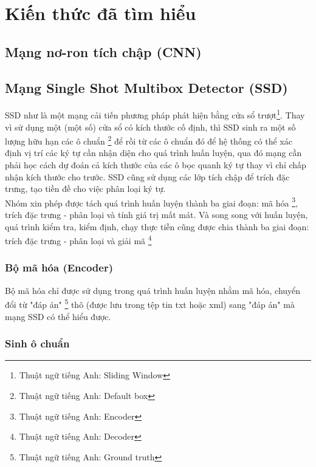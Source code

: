 \documentclass[a4paper,12pt]{article}
\begin{document}
	
	
	
	\newpage
	\section{Kiến thức đã tìm hiểu}
	\subsection{Mạng nơ-ron tích chập (CNN)}
	
	\subsection{Mạng Single Shot Multibox Detector (SSD)}
	
	SSD như là một mạng cải tiến phương pháp phát hiện bằng cửa sổ trượt\footnote{Thuật ngữ tiếng Anh: Sliding Window}. Thay vì sử dụng một (một số) cửa sổ có kích thước cố định, thì SSD sinh ra một số lượng hữu hạn các ô chuẩn \footnote{Thuật ngữ tiếng Anh: Default box} để rồi từ các ô chuẩn đó để hệ thống có thể xác định vị trí các ký tự cần nhận diện cho quá trình huấn luyện, qua đó mạng cần phải học cách dự đoán cả kích thước của các ô bọc quanh ký tự thay vì chỉ chấp nhận kích thước cho trước. SSD cũng sử dụng các lớp tích chập để trích đặc trưng, tạo tiền đề cho việc phân loại ký tự. \\
	
	Nhóm xin phép được tách quá trình huấn luyện thành ba giai đoạn: mã hóa \footnote{Thuật ngữ tiếng Anh: Encoder}, trích đặc trưng - phân loại và tính giá trị mất mát. Và song song với huấn luyện, quá trình kiểm tra, kiểm định, chạy thực tiễn cũng được chia thành ba giai đoạn: trích đặc trưng - phân loại và giải mã \footnote{Thuật ngữ tiếng Anh: Decoder}
	
	\subsubsection{Bộ mã hóa (Encoder)}
	Bộ mã hóa chỉ được sử dụng trong quá trình huấn luyện nhằm mã hóa, chuyển đổi từ "đáp án" \footnote{Thuật ngữ tiếng Anh: Ground truth} thô (được lưu trong tệp tin txt hoặc xml) sang "đáp án" mà mạng SSD có thể hiểu được.
	
	\subsubsection*{Sinh ô chuẩn}
	
\end{document}
